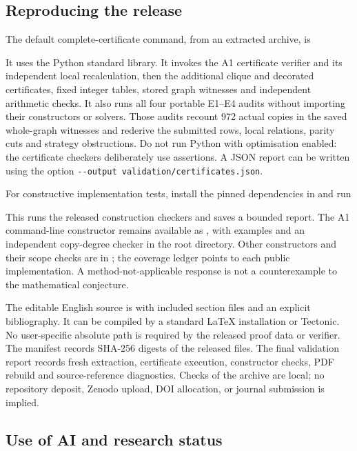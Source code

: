 \subsection{Reproducing the release}

The default complete-certificate command, from an extracted archive, is
\begin{center}\end{center}
It uses the Python standard library. It invokes the A1 certificate
verifier and its independent local recalculation, then the additional
clique and decorated certificates, fixed integer tables, stored graph
witnesses and independent arithmetic checks. It also runs all four
portable E1--E4 audits without importing their constructors or solvers.
Those audits recount 972 actual copies in the saved whole-graph witnesses
and rederive the submitted rows, local relations, parity cuts and
strategy obstructions. Do not run Python with
optimisation enabled: the certificate checkers deliberately use
assertions. A JSON report can be written using the option
\texttt{-{}-output validation/certificates.json}.

For constructive implementation tests, install the pinned dependencies
in  and run
\begin{center}\end{center}
This runs the released construction checkers and saves a bounded report.
The A1 command-line constructor remains available as
, with examples and an independent copy-degree
checker in the root directory. Other constructors and their scope
checks are in ; the coverage ledger points to each
public implementation. A method-not-applicable response is not a
counterexample to the mathematical conjecture.

The editable English source is  with included
section files and an explicit bibliography. It can be compiled by a
standard LaTeX installation or Tectonic. No user-specific absolute path
is required by the released proof data or verifier. The manifest records
SHA-256 digests of the released files. The final validation report records
fresh extraction, certificate execution, constructor checks, PDF rebuild
and source-reference diagnostics. Checks of the archive are local;
no repository deposit, Zenodo upload, DOI allocation, or journal
submission is implied.

\subsection{Use of AI and research status}

